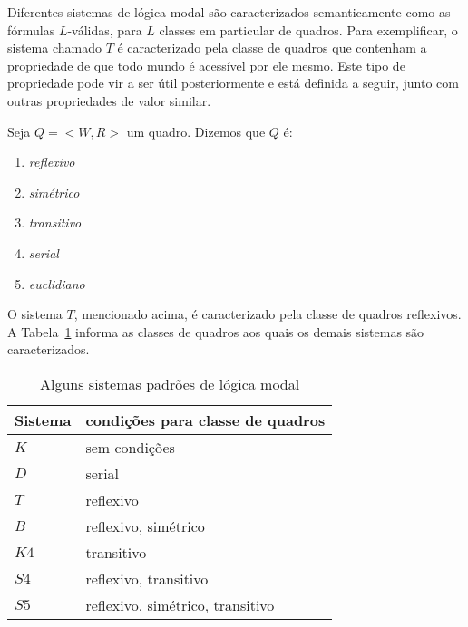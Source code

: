 Diferentes sistemas de lógica modal são caracterizados semanticamente como as
fórmulas $L$-válidas, para $L$ classes em particular de quadros. Para
exemplificar, o sistema chamado $T$ é caracterizado pela classe de quadros que
contenham a propriedade de que todo mundo é acessível por ele mesmo. Este tipo
de propriedade pode vir a ser útil posteriormente e está definida a seguir,
junto com outras propriedades de valor similar.

\begin{definition}
    Seja $Q = <W,R>$ um quadro. Dizemos que $Q$ é:
    \begin{enumerate}
        \item \textit{reflexivo}
        \item \textit{simétrico}
        \item \textit{transitivo}
        \item \textit{serial}
        \item \textit{euclidiano}
    \end{enumerate}
    
\end{definition}

O sistema $T$, mencionado acima, é caracterizado pela classe de quadros
reflexivos. A Tabela~\ref{table:condicoes_quadro} informa as classes de quadros
aos quais os demais sistemas são caracterizados.

\begin{table}[h!]
    \begin{center}
        \label{table:condicoes_quadro}
        \caption{Alguns sistemas padrões de lógica modal}
        \begin{tabular}{ll}
            \hline
            Sistema & condições para classe de quadros \\
            \hline
            $K$  & sem condições \\  
            $D$  & serial \\ 
            $T$  & reflexivo \\ 
            $B$  & reflexivo, simétrico\\ 
            $K4$ & transitivo \\  
            $S4$ & reflexivo, transitivo \\  
            $S5$ & reflexivo, simétrico, transitivo \\
            \hline
        \end{tabular}
    \end{center}
\end{table}

